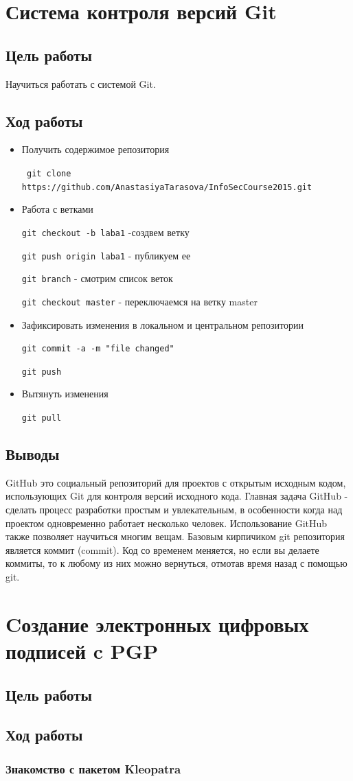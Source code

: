 \documentclass[12pt,a4paper]{article}
\begin{document}
\newpage
\section{Система контроля версий Git}

\subsection{Цель работы}
Научиться работать с системой Git.
\subsection{Ход работы}
\begin{itemize}
\item Получить содержимое репозитория

\verb+ git clone https://github.com/AnastasiyaTarasova/InfoSecCourse2015.git+

\item Работа с ветками

\verb+git checkout -b laba1+ -создвем ветку

\verb+git push origin laba1+ - публикуем ее

\verb+git branch+ - смотрим список веток

\verb+git checkout master+ - переключаемся на ветку master

\item Зафиксировать изменения в локальном и центральном репозитории

\verb+git commit -a -m "file changed"+ 

\verb+git push+ 

\item Вытянуть изменения

\verb+git pull+

\end{itemize}

\subsection{Выводы}
GitHub это социальный репозиторий для проектов с открытым исходным кодом, использующих Git для контроля версий исходного кода. Главная задача GitHub - сделать процесс разработки простым и увлекательным, в особенности когда над проектом одновременно работает несколько человек. Использование GitHub также позволяет научиться многим вещам. Базовым кирпичиком git репозитория является коммит (commit). Код со временем меняется, но если вы делаете коммиты, то к любому из них можно вернуться, отмотав время назад с помощью git.
\newpage
\section{Cоздание электронных цифровых подписей c PGP}

\subsection{Цель работы}

\subsection{Ход работы}

\subsubsection{Знакомство с пакетом Kleopatra}
\end{document}
